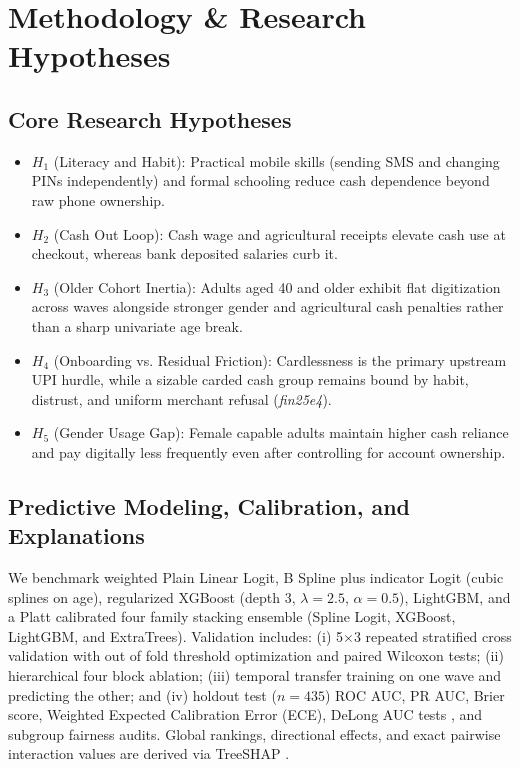 \documentclass[conference]{IEEEtran}
\begin{document}
\section{Methodology \& Research Hypotheses}

\subsection{Core Research Hypotheses}
\begin{itemize}
    \item $H_1$ (Literacy and Habit): Practical mobile skills (sending SMS and changing PINs independently) and formal schooling reduce cash dependence beyond raw phone ownership.
    \item $H_2$ (Cash Out Loop): Cash wage and agricultural receipts elevate cash use at checkout, whereas bank deposited salaries curb it.
    \item $H_3$ (Older Cohort Inertia): Adults aged 40 and older exhibit flat digitization across waves alongside stronger gender and agricultural cash penalties rather than a sharp univariate age break.
    \item $H_4$ (Onboarding vs. Residual Friction): Cardlessness is the primary upstream UPI hurdle, while a sizable carded cash group remains bound by habit, distrust, and uniform merchant refusal (\textit{fin25e4}).
    \item $H_5$ (Gender Usage Gap): Female capable adults maintain higher cash reliance and pay digitally less frequently even after controlling for account ownership.
\end{itemize}

\subsection{Predictive Modeling, Calibration, and Explanations}
We benchmark weighted Plain Linear Logit, B Spline plus indicator Logit (cubic splines on age), regularized XGBoost \cite{chen2016} (depth 3, $\lambda = 2.5$, $\alpha = 0.5$), LightGBM, and a Platt calibrated four family stacking ensemble (Spline Logit, XGBoost, LightGBM, and ExtraTrees). Validation includes: (i) 5$\times$3 repeated stratified cross validation with out of fold threshold optimization and paired Wilcoxon tests; (ii) hierarchical four block ablation; (iii) temporal transfer training on one wave and predicting the other; and (iv) holdout test ($n = 435$) ROC AUC, PR AUC, Brier score, Weighted Expected Calibration Error (ECE), DeLong AUC tests \cite{delong1988}, and subgroup fairness audits. Global rankings, directional effects, and exact pairwise interaction values are derived via TreeSHAP \cite{lundberg2020}.
\end{document}
